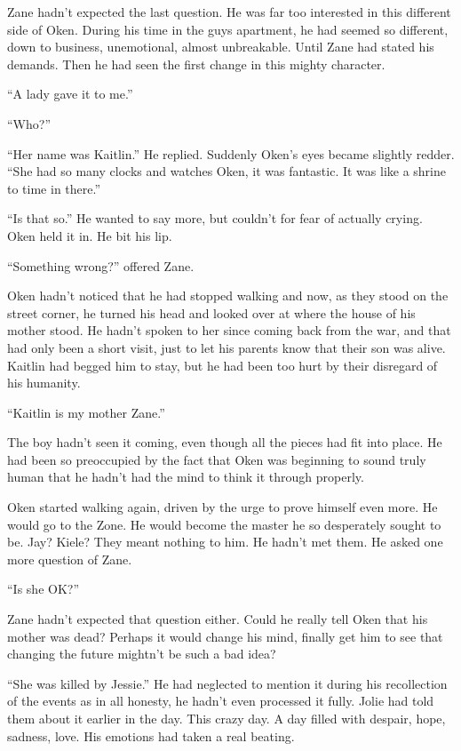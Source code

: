 Zane hadn't expected the last question.  He was far too interested in this different side of Oken.  During his time in the guys apartment, he had seemed so different, down to business, unemotional, almost unbreakable.  Until Zane had stated his demands.  Then he had seen the first change in this mighty character.

``A lady gave it to me.''

``Who?''

``Her name was Kaitlin.''  He replied.  Suddenly Oken's eyes became slightly redder.  ``She had so many clocks and watches Oken, it was fantastic.  It was like a shrine to time in there.''

``Is that so.''  He wanted to say more, but couldn't for fear of actually crying.  Oken held it in.  He bit his lip.

``Something wrong?'' offered Zane.

Oken hadn't noticed that he had stopped walking and now, as they stood on the street corner, he turned his head and looked over at where the house of his mother stood.  He hadn't spoken to her since coming back from the war, and that had only been a short visit, just to let his parents know that their son was alive.  Kaitlin had begged him to stay, but he had been too hurt by their disregard of his humanity.

``Kaitlin is my mother Zane.''  

The boy hadn't seen it coming, even though all the pieces had fit into place.  He had been so preoccupied by the fact that Oken was beginning to sound truly human that he hadn't had the mind to think it through properly.  

Oken started walking again, driven by the urge to prove himself even more.  He would go to the Zone.  He would become the master he so desperately sought to be.  Jay?  Kiele?  They meant nothing to him.  He hadn't met them.  He asked one more question of Zane.

``Is she OK?''

Zane hadn't expected that question either.  Could he really tell Oken that his mother was dead?  Perhaps it would change his mind, finally get him to see that changing the future mightn't be such a bad idea?

``She was killed by Jessie.''  He had neglected to mention it during his recollection of the events as in all honesty, he hadn't even processed it fully.  Jolie had told them about it earlier in the day.  This crazy day.  A day filled with despair, hope, sadness, love.  His emotions had taken a real beating.  


